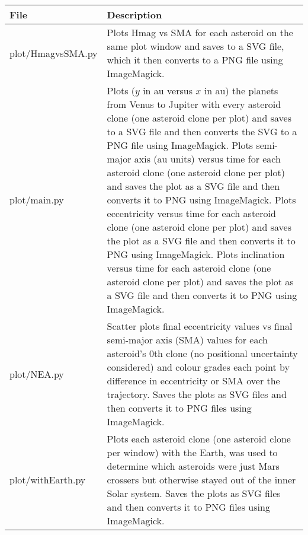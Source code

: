 \documentclass[12pt,a4paper]{article}
\begin{document}
\begin{tabular}{|m{15em}|m{30em}|}
    \hline
    File & Description \\\hline
    plot/HmagvsSMA.py & Plots Hmag vs SMA for each asteroid on the same plot window and saves to a SVG file, which it then converts to a PNG file using ImageMagick. \\\hline
    plot/main.py & Plots ($y$ in au versus $x$ in au) the planets from Venus to Jupiter with every asteroid clone (one asteroid clone per plot) and saves to a SVG file and then converts the SVG to a PNG file using ImageMagick. Plots semi-major axis (au units) versus time for each asteroid clone (one asteroid clone per plot) and saves the plot as a SVG file and then converts it to PNG using ImageMagick. Plots eccentricity versus time for each asteroid clone (one asteroid clone per plot) and saves the plot as a SVG file and then converts it to PNG using ImageMagick. Plots inclination versus time for each asteroid clone (one asteroid clone per plot) and saves the plot as a SVG file and then converts it to PNG using ImageMagick.\\\hline
    plot/NEA.py & Scatter plots final eccentricity values vs final semi-major axis (SMA) values for each asteroid's 0th clone (no positional uncertainty considered) and colour grades each point by difference in eccentricity or SMA over the trajectory. Saves the plots as SVG files and then converts it to PNG files using ImageMagick.\\\hline
    plot/withEarth.py & Plots each asteroid clone (one asteroid clone per window) with the Earth, was used to determine which asteroids were just Mars crossers but otherwise stayed out of the inner Solar system. Saves the plots as SVG files and then converts it to PNG files using ImageMagick.\\\hline
\end{tabular}
\end{document}
